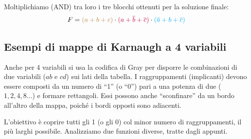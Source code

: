 Moltiplichiamo (AND) tra loro i tre blocchi ottenuti per la soluzione finale:
\[ F = \textcolor{brown}{(a+b+c)} \cdot \textcolor{purple}{(a+\overline{b}+\overline{c})} \cdot \textcolor{cyan}{(\overline{a}+b+\overline{c})} \]

\subsection{Esempi di mappe di Karnaugh a 4 variabili}

\noindent Anche per 4 variabili si usa la codifica di Gray per disporre le combinazioni di due variabili ($ab$ e $cd$) sui lati della tabella. I raggruppamenti (implicanti) devono essere composti da un numero di ``1'' (o ``0'') pari a una potenza di due ($1, 2, 4, 8\ldots$) e formare rettangoli. Essi possono anche ``sconfinare'' da un bordo all'altro della mappa, poiché i bordi opposti sono adiacenti. 

L'obiettivo è coprire tutti gli 1 (o gli 0) col minor numero di raggruppamenti, il più larghi possibile. Analizziamo due funzioni diverse, tratte dagli appunti.

